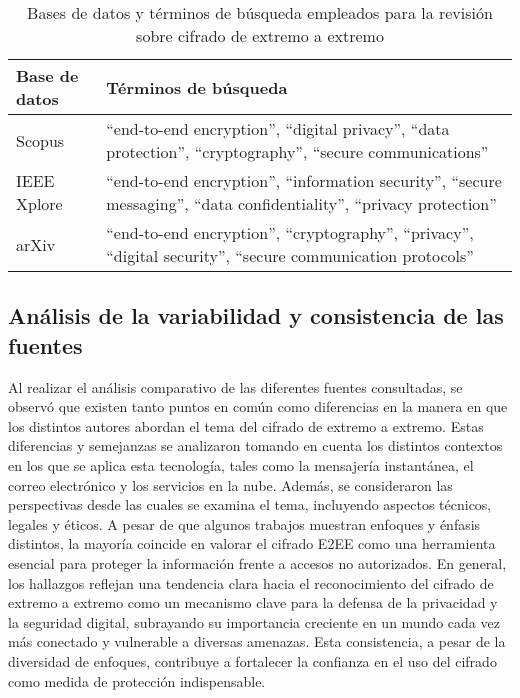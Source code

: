 \documentclass[spanish,12pt,a4paper]{article}
\begin{document}
	\begin{table}[ht]
		\centering
		\caption{Bases de datos y términos de búsqueda empleados para la revisión sobre cifrado de extremo a extremo}
		\label{tab:busqueda}
		\vspace{0.5cm}
		\begin{tabularx}{\textwidth}{l X}
			\hline
			\textbf{Base de datos} & \textbf{Términos de búsqueda} \\
			\hline
			Scopus & “end-to-end encryption”, “digital privacy”, “data protection”, “cryptography”, “secure communications” \\
			\hline
			IEEE Xplore & “end-to-end encryption”, “information security”, “secure messaging”, “data confidentiality”, “privacy protection” \\
			\hline
			arXiv & “end-to-end encryption”, “cryptography”, “privacy”, “digital security”, “secure communication protocols” \\
			\hline
		\end{tabularx}
	\end{table}
	
	
		
	\begin{multicols}{2}
		
		\subsection*{\normalsize Análisis de la variabilidad y consistencia de las fuentes }
		
		Al realizar el análisis comparativo de las diferentes fuentes consultadas, se observó que existen tanto puntos en común como diferencias en la manera en que los distintos autores abordan el tema del cifrado de extremo a extremo. Estas diferencias y semejanzas se analizaron tomando en cuenta los distintos contextos en los que se aplica esta tecnología, tales como la mensajería instantánea, el correo electrónico y los servicios en la nube. Además, se consideraron las perspectivas desde las cuales se examina el tema, incluyendo aspectos técnicos, legales y éticos. A pesar de que algunos trabajos muestran enfoques y énfasis distintos, la mayoría coincide en valorar el cifrado E2EE como una herramienta esencial para proteger la información frente a accesos no autorizados. En general, los hallazgos reflejan una tendencia clara hacia el reconocimiento del cifrado de extremo a extremo como un mecanismo clave para la defensa de la privacidad y la seguridad digital, subrayando su importancia creciente en un mundo cada vez más conectado y vulnerable a diversas amenazas. Esta consistencia, a pesar de la diversidad de enfoques, contribuye a fortalecer la confianza en el uso del cifrado como medida de protección indispensable.
	\end{multicols}
		
		
	\printbibliography
	
\end{document}
